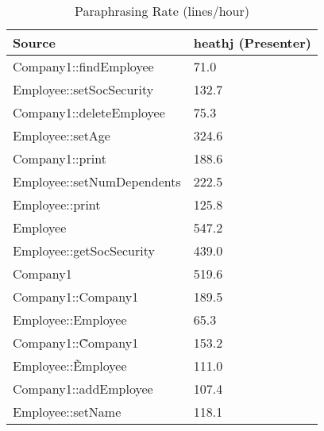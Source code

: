 \begin{table}[hb]
\begin{center}
\begin{tabular}{|l|l|}
\hline
Source & heathj (Presenter)\\
\hline
Company1::findEmployee & 71.0\\
Employee::setSocSecurity & 132.7\\
Company1::deleteEmployee & 75.3\\
Employee::setAge & 324.6\\
Company1::print & 188.6\\
Employee::setNumDependents & 222.5\\
Employee::print & 125.8\\
Employee & 547.2\\
Employee::getSocSecurity & 439.0\\
Company1 & 519.6\\
Company1::Company1 & 189.5\\
Employee::Employee & 65.3\\
Company1::\~Company1 & 153.2\\
Employee::\~Employee & 111.0\\
Company1::addEmployee & 107.4\\
Employee::setName & 118.1\\
\hline
\end{tabular}
\end{center}
\caption{Paraphrasing Rate (lines/hour)}
\end{table}

